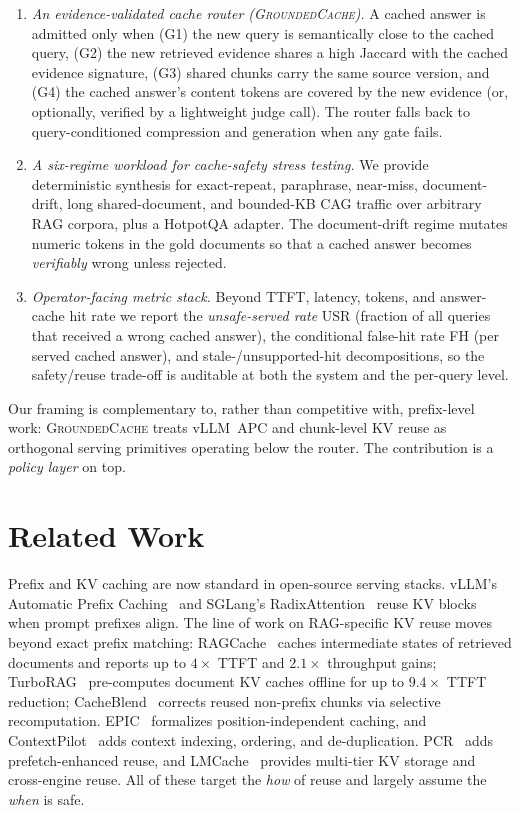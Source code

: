 \documentclass[11pt]{article}
\newcommand{\sys}{\textsc{GroundedCache}\xspace}
\begin{document}
\begin{enumerate}
  \item \emph{An evidence-validated cache router (\sys).} A cached answer
        is admitted only when (G1) the new query is semantically close to
        the cached query, (G2) the new retrieved evidence shares a high
        Jaccard with the cached evidence signature, (G3) shared chunks carry
        the same source version, and (G4) the cached answer's content tokens
        are covered by the new evidence (or, optionally, verified by a
        lightweight judge call). The router falls back to query-conditioned
        compression and generation when any gate fails.
  \item \emph{A six-regime workload for cache-safety stress testing.} We
        provide deterministic synthesis for exact-repeat, paraphrase,
        near-miss, document-drift, long shared-document, and bounded-KB CAG
        traffic over arbitrary RAG corpora, plus a HotpotQA adapter. The
        document-drift regime mutates numeric tokens in the gold documents
        so that a cached answer becomes \emph{verifiably} wrong unless
        rejected.
  \item \emph{Operator-facing metric stack.} Beyond TTFT, latency,
        tokens, and answer-cache hit rate we report the \emph{unsafe-served
        rate} USR (fraction of all queries that received a wrong cached
        answer), the conditional false-hit rate FH (per served cached
        answer), and stale-/unsupported-hit decompositions, so the
        safety/reuse trade-off is auditable at both the system and the
        per-query level.
\end{enumerate}

Our framing is complementary to, rather than competitive with, prefix-level
work: \sys{} treats vLLM~APC and chunk-level KV reuse as orthogonal serving
primitives operating below the router. The contribution is a \emph{policy
layer} on top.


\section{Related Work}
Prefix and KV caching are now standard in open-source serving stacks.
vLLM's Automatic Prefix Caching~\citep{vllm-apc} and SGLang's
RadixAttention~\citep{zheng2024sglang} reuse KV blocks when prompt prefixes
align. The line of work on RAG-specific KV reuse moves beyond exact prefix
matching: RAGCache~\citep{ragcache} caches intermediate states of retrieved
documents and reports up to $4\times$ TTFT and $2.1\times$ throughput gains;
TurboRAG~\citep{turborag} pre-computes document KV caches offline for up to
$9.4\times$ TTFT reduction; CacheBlend~\citep{cacheblend} corrects reused
non-prefix chunks via selective recomputation. EPIC~\citep{epic} formalizes
position-independent caching, and ContextPilot~\citep{contextpilot} adds
context indexing, ordering, and de-duplication. PCR~\citep{pcr} adds
prefetch-enhanced reuse, and LMCache~\citep{lmcache} provides multi-tier KV
storage and cross-engine reuse. All of these target the \emph{how} of reuse
and largely assume the \emph{when} is safe.
\end{document}
